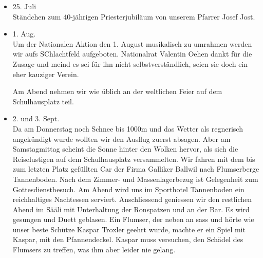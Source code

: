 \begin{multicols}{2}
\begin{itemize}
        \item[]25. Juli\\
        Ständchen zum 40-jährigen Priesterjubiläum von unserem Pfarrer Josef
        Jost.

        \item[]1. Aug.\\
        Um der Nationalen Aktion den 1. August musikalisch zu umrahmen werden
        wir aufs SChlachtfeld aufgeboten. Nationalrat Valentin Oehen dankt für
        die Zusage und meind es sei für ihn nicht selbstverständlich, seien sie
        doch ein eher kauziger Verein.

        Am Abend nehmen wir wie üblich an der weltlichen Feier auf dem
        Schulhausplatz teil.

        \item[]2. und 3. Sept.\\
        Da am Donnerstag noch Schnee bis 1000m und das Wetter als regnerisch
        angekündigt wurde wollten wir den Ausflug zuerst absagen. Aber am
        Samstagmittag scheint die Sonne hinter den Wolken hervor, als sich die
        Reiselustigen auf dem Schulhausplatz versammelten. Wir fahren mit dem
        bis zum letzten Platz gefüllten Car der Firma Galliker Ballwil nach
        Flumserberge Tannenboden. Nach dem Zimmer- und Massenlagerbezug ist
        Gelegenheit zum Gottesdienstbesuch. Am Abend wird uns im Sporthotel
        Tannenboden ein reichhaltiges Nachtessen serviert. Anschliessend
        geniessen wir den restlichen Abend im Sääli mit Unterhaltung der
        Ronspatzen und an der Bar. Es wird gesungen und Duett geblasen. Ein
        Flumser, der neben an sass und hörte wie unser beste Schütze Kaspar
        Troxler geehrt wurde, machte er ein Spiel mit Kaspar, mit den
        Pfannendeckel. Kaspar muss versuchen, den Schädel des Flumsers zu
        treffen, was ihm aber leider nie gelang.

    \end{itemize}

\end{multicols}

